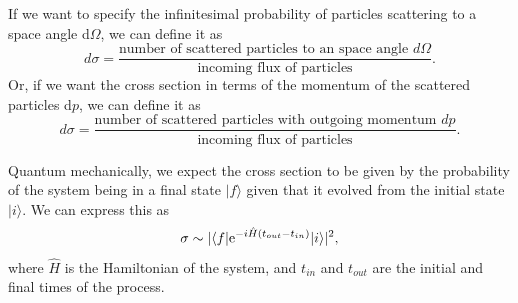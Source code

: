 If we want to specify the infinitesimal probability of particles scattering to a space angle d$\Omega$, we can define it as
\begin{equation}
    \label{eq:diff_cross_sec}
    d\sigma = \frac{\text{number of scattered particles to an space angle } d\Omega}{\text{incoming flux of particles}}.
\end{equation}
Or, if we want the cross section in terms of the momentum of the scattered particles d$p$, we can define it as 
\begin{equation}
    \label{eq:diff_cross_sec_p}
    d\sigma = \frac{\text{number of scattered particles with outgoing momentum } dp}{\text{incoming flux of particles}}.
\end{equation}

Quantum mechanically, we expect the cross section to be given by the probability of the system being in a final state $|f\rangle$ given that it evolved from the initial state $|i\rangle$.
We can express this as 
\begin{equation}
    \label{eq:cross_sec_qm}
    \sigma \sim |\langle f | \mathrm{e}^{-i \hat{H} (t_{out} - t_{in})} | i \rangle |^2,
\end{equation}
where $\hat{H}$ is the Hamiltonian of the system, and $t_{in}$ and $t_{out}$ are the initial and final times of the process.


